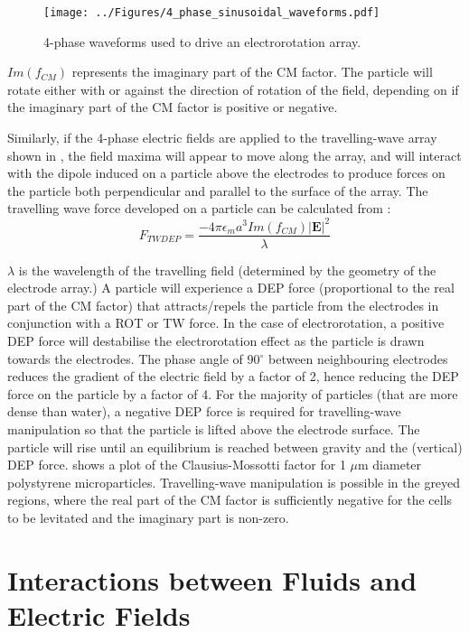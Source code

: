 \begin{figure}[p]
 \centering
 \texttt{[image: ../Figures/4\_phase\_sinusoidal\_waveforms.pdf]}
 \caption{4-phase waveforms used to drive an electrorotation array.}
 \label{fig:4_phase_sinusoidal_waveforms}
\end{figure}

$Im(f_{CM})$ represents the imaginary part of the CM factor. The particle will rotate either with or against the direction of rotation of the field, depending on if the imaginary part of the CM factor is positive or negative.

Similarly, if the 4-phase electric fields are applied to the travelling-wave array shown in , the field maxima will appear to move along the array, and will interact with the dipole induced on a particle above the electrodes to produce forces on the particle both perpendicular and parallel to the surface of the array. The travelling wave force developed on a particle can be calculated from \citep{Morgan:1997}:
\nopagebreak[3]
\begin{equation}
 F_{TWDEP} = \frac{-4\pi\epsilon_{m}a^{3} Im(f_{CM}) |\textbf{E}|^{2}}{\lambda}
\end{equation}

$\lambda$ is the wavelength of the travelling field (determined by the geometry of the electrode array.) A particle will experience a DEP force (proportional to the real part of the CM factor) that attracts/repels the particle from the electrodes in conjunction with a ROT or TW force. In the case of electrorotation, a positive DEP force will destabilise the electrorotation effect as the particle is drawn towards the electrodes. The phase angle of 90$^{\circ}$ between neighbouring electrodes reduces the gradient of the electric field by a factor of 2, hence reducing the DEP force on the particle by a factor of 4. For the majority of particles (that are more dense than water), a negative DEP force is required for travelling-wave manipulation so that the particle is lifted above the electrode surface. The particle will rise until an equilibrium is reached between gravity and the (vertical) DEP force.  shows a plot of the Clausius-Mossotti factor for 1 $\mu$m diameter polystyrene microparticles. Travelling-wave manipulation is possible in the greyed regions, where the real part of the CM factor is sufficiently negative for the cells to be levitated and the imaginary part is non-zero.

\section{Interactions between Fluids and Electric Fields}
